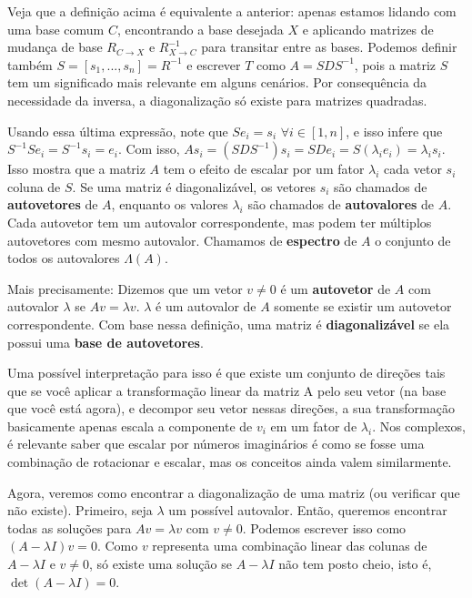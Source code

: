 \documentclass[11pt, a4paper]{article}
\begin{document}
Veja que a definição acima é equivalente a anterior: apenas estamos lidando com uma base comum \(C\), encontrando a base desejada \(X\) e aplicando matrizes de mudança de base \(R_{C \rightarrow X}\) e \(R^{-1}_{X \rightarrow C}\) para transitar entre as bases. Podemos definir também \(S=[s_1,...,s_n]=R^{-1}\) e escrever \(T\) como \(A=SDS^{-1}\), pois a matriz \(S\) tem um significado mais relevante em alguns cenários. Por consequência da necessidade da inversa, a diagonalização só existe para matrizes quadradas.

Usando essa última expressão, note que \(Se_i=s_i\) \(\forall i \in [1,n]\), e isso infere que \(S^{-1}Se_ i=S^{-1}s_i=e_i\). Com isso, \(As_i=(SDS^{-1})s_i=SDe_i=S(\lambda_ie_i)=\lambda_is_i\). Isso mostra que a matriz \(A\) tem o efeito de escalar por um fator \(\lambda_i\) cada vetor \(s_i\) coluna de \(S\). Se uma matriz é diagonalizável, os vetores \(s_i\) são chamados de \textbf{autovetores} de \(A\), enquanto os valores \(\lambda_i\) são chamados de \textbf{autovalores} de \(A\). Cada autovetor tem um autovalor correspondente, mas podem ter múltiplos autovetores com mesmo autovalor. Chamamos de \textbf{espectro} de \(A\) o conjunto de todos os autovalores \(\Lambda (A)\).

Mais precisamente: Dizemos que um vetor \(v \ne 0\) é um \textbf{autovetor} de \(A\) com autovalor \(\lambda\) se \(Av=\lambda v\). \(\lambda\) é um autovalor de \(A\) somente se existir um autovetor correspondente. Com base nessa definição, uma matriz é \textbf{diagonalizável} se ela possui uma \textbf{base de autovetores}.

Uma possível interpretação para isso é que existe um conjunto de direções tais que se você aplicar a transformação linear da matriz A pelo seu vetor (na base que você está agora), e decompor seu vetor nessas direções, a sua transformação basicamente apenas escala a componente de \(v_i\) em um fator de \(\lambda_i\). Nos complexos, é relevante saber que escalar por números imaginários é como se fosse uma combinação de rotacionar e escalar, mas os conceitos ainda valem similarmente.

Agora, veremos como encontrar a diagonalização de uma matriz (ou verificar que não existe). Primeiro, seja \(\lambda\) um possível autovalor. Então, queremos encontrar todas as soluções para \(Av=\lambda v\) com \(v\ne 0\). Podemos escrever isso como \((A-\lambda I)v=0\). Como \(v\) representa uma combinação linear das colunas de \(A-\lambda I\) e \(v\ne 0\), só existe uma solução se \(A-\lambda I\) não tem posto cheio, isto é, \(\det(A-\lambda I)=0\).
\end{document}
